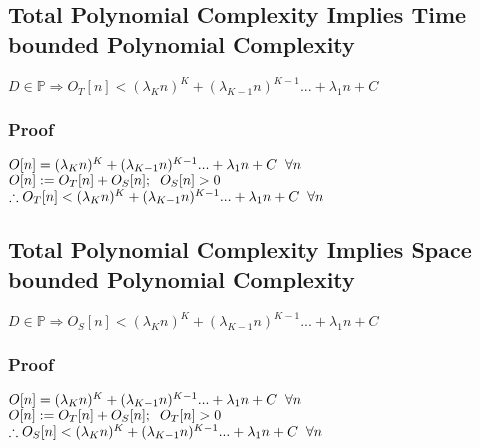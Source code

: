 \documentclass[11pt]{article}
\begin{document}
\subsection{Total Polynomial Complexity Implies Time bounded Polynomial Complexity}
\begin{center}
\vspace{1mm}
$
D \in \mathbb{P} \Longrightarrow O_T[n] < (\lambda_K n)^K + (\lambda_{K-1} n)^{K-1}... + \lambda_1 n + C
$
\end{center}

\subsubsection{Proof}
\begin{center}
$
O[n] = (\lambda_K n)^K + (\lambda_{K-1} n)^{K-1}... + \lambda_1 n + C \hspace{2mm} \forall n
$
\\ \vspace{2mm}
$
O[n] := O_T[n] + O_S[n]; \hspace{2mm} O_S[n] > 0
$
\\ \vspace{2mm}
$
\therefore O_T[n] < (\lambda_K n)^K + (\lambda_{K-1} n)^{K-1}... + \lambda_1 n + C \hspace{2mm} \forall n
$
\end{center}










\subsection{Total Polynomial Complexity Implies Space bounded Polynomial Complexity}
\begin{center}
\vspace{1mm}
$
D \in \mathbb{P} \Longrightarrow O_S[n] <  (\lambda_K n)^K + (\lambda_{K-1} n)^{K-1}... + \lambda_1 n + C
$
\end{center}

\subsubsection{Proof}
\begin{center}
$
O[n] = (\lambda_K n)^K + (\lambda_{K-1} n)^{K-1}... + \lambda_1 n + C \hspace{2mm} \forall n
$
\\ \vspace{2mm}
$
O[n] := O_T[n] + O_S[n]; \hspace{2mm} O_T[n] > 0
$
\\ \vspace{2mm}
$
\therefore O_S[n] < (\lambda_K n)^K + (\lambda_{K-1} n)^{K-1}... + \lambda_1 n + C \hspace{2mm} \forall n
$
\end{center}
\end{document}
